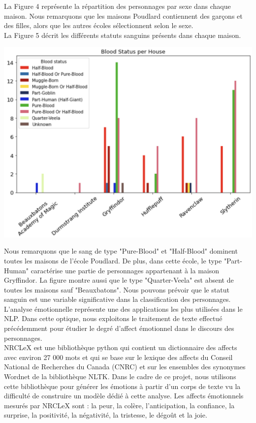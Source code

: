 \documentclass[11pt]{article}
\begin{document}
La Figure 4 représente la répartition des personnages par sexe dans chaque maison. Nous remarquons que les maisons Poudlard contiennent des garçons et des filles, alors que les autres écoles sélectionnent selon le sexe.\\

La Figure 5 décrit les différents statuts sanguins présents dans chaque maison. 

\begin{center}
    \includegraphics[width= 15 cm]{./figures/blood_status.png}
\end{center}

Nous remarquons que le sang de type "Pure-Blood" et "Half-Blood" dominent toutes les maisons de l'école Poudlard. De plus, dans cette école, le type "Part-Human" caractérise une partie de personnages appartenant à la maison Gryffindor. La figure montre aussi que le type "Quarter-Veela" est absent de toutes les maisons sauf "Beauxbatons". Nous pouvons prévoir que le statut sanguin est une variable significative dans la classification des personnages.\\

L'analyse émotionnelle représente une des applications les plus utilisées dans le NLP. Dans cette optique, nous exploitons le traitement de texte effectué précédemment pour étudier le degré d'affect émotionnel dans le discours des personnages.\\

NRCLeX est une bibliothèque python qui contient un dictionnaire des affects avec environ 27 000 mots et qui se base sur le lexique des affects du Conseil National de Recherches du Canada (CNRC) et sur les ensembles des synonymes Wordnet de la bibliothèque NLTK. Dans le cadre de ce projet, nous utilisons cette bibliothèque pour générer les émotions à partir d'un corps de texte vu la difficulté de construire un modèle dédié à cette analyse. Les affects émotionnels mesurés par NRCLeX sont : la peur, la colère, l'anticipation, la confiance, la surprise, la positivité, la négativité, la tristesse, le dégoût et la joie.\\
\end{document}
